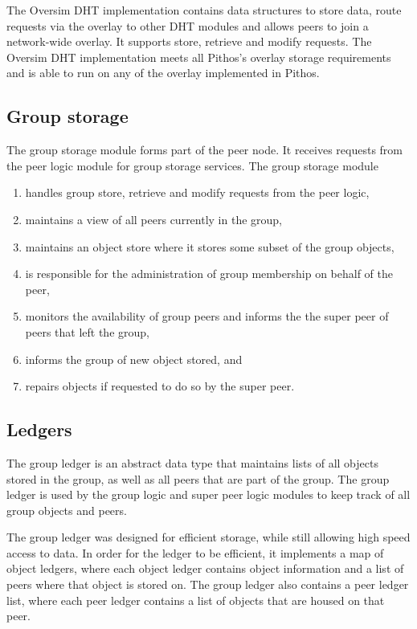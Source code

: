 The Oversim DHT implementation contains data structures to store data, route requests via the overlay to other DHT modules and allows peers to join a network-wide overlay. It supports store, retrieve and modify requests. The Oversim DHT implementation meets all Pithos's overlay storage requirements and is able to run on any of the overlay implemented in Pithos.

\subsection{Group storage}

The group storage module forms part of the peer node. It receives requests from the peer logic module for group storage services. The group storage module
\begin{enumerate}
  \item handles group store, retrieve and modify requests from the peer logic,
  \item maintains a view of all peers currently in the group,
  \item maintains an object store where it stores some subset of the group objects,
  \item is responsible for the administration of group membership on behalf of the peer,
  \item monitors the availability of group peers and informs the the super peer of peers that left the group,
  \item informs the group of new object stored, and
  \item repairs objects if requested to do so by the super peer.
\end{enumerate}

\subsection{Ledgers}
\label{pithos_module_types_ledgers}

The group ledger is an abstract data type that maintains lists of all objects stored in the group, as well as all peers that are part of the group. The group ledger is used by the group logic and super peer logic modules to keep track of all group objects and peers.

The group ledger was designed for efficient storage, while still allowing high speed access to data. In order for the ledger to be efficient, it implements a map of object ledgers, where each object ledger contains object information and a list of peers where that object is stored on. The group ledger also contains a peer ledger list, where each peer ledger contains a list of objects that are housed on that peer.

